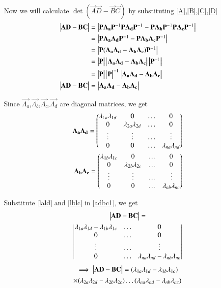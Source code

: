 \documentclass[journal,12pt,twocolumn]{IEEEtran}
\begin{document}
Now we will calculate $\det(\vec{A}\vec{D}-\vec{B}\vec{C})$ by substituting \eqref{A},\eqref{B},\eqref{C},\eqref{D}
\begin{align}
    \begin{vmatrix}\mathbf{A}\mathbf{D}-\mathbf{B}\mathbf{C}\end{vmatrix}&=\begin{vmatrix}\mathbf{P}\mathbf{\Lambda_a}\mathbf{P}^{-1}\mathbf{P}\mathbf{\Lambda_d}\mathbf{P}^{-1}-\mathbf{P}\mathbf{\Lambda_b}\mathbf{P}^{-1}\mathbf{P}\mathbf{\Lambda_c}\mathbf{P}^{-1}\end{vmatrix}\\
    &=\begin{vmatrix}\mathbf{P}\mathbf{\Lambda_a}\mathbf{\Lambda_d}\mathbf{P}^{-1}-\mathbf{P}\mathbf{\Lambda_b}\mathbf{\Lambda_c}\mathbf{P}^{-1}\end{vmatrix}\\
    &=\begin{vmatrix}\mathbf{P}(\mathbf{\Lambda_a}\mathbf{\Lambda_d}-\mathbf{\Lambda_b}\mathbf{\Lambda_c})\mathbf{P}^{-1}\end{vmatrix}\\
    &=\begin{vmatrix}\mathbf{P}\end{vmatrix}\begin{vmatrix}\mathbf{\Lambda_a}\mathbf{\Lambda_d}-\mathbf{\Lambda_b}\mathbf{\Lambda_c}\end{vmatrix}\begin{vmatrix}\mathbf{P}^{-1}\end{vmatrix}\\
    &=\begin{vmatrix}\mathbf{P}\end{vmatrix}\begin{vmatrix}\mathbf{P}\end{vmatrix}^{-1}\begin{vmatrix}\mathbf{\Lambda_a}\mathbf{\Lambda_d}-\mathbf{\Lambda_b}\mathbf{\Lambda_c}\end{vmatrix}\\
    \begin{vmatrix}\mathbf{A}\mathbf{D}-\mathbf{B}\mathbf{C}\end{vmatrix}&=\begin{vmatrix}\mathbf{\Lambda_a}\mathbf{\Lambda_d}-\mathbf{\Lambda_b}\mathbf{\Lambda_c}\end{vmatrix}\label{adbc1}
\end{align}

Since $\vec{\Lambda_a}$,$\vec{\Lambda_b}$,$\vec{\Lambda_c}$,$\vec{\Lambda_d}$ are diagonal matrices, we get
\begin{align}
    \mathbf{\Lambda_a}\mathbf{\Lambda_d}=\begin{pmatrix}\lambda_{1a}\lambda_{1d}&0&\dots&0\\0&\lambda_{2a}\lambda_{2d}&\dots&0\\\vdots&\vdots&\dots&\vdots\\0&0&\dots&\lambda_{na}\lambda_{nd}\end{pmatrix}\label{lald}\\
    \mathbf{\Lambda_b}\mathbf{\Lambda_c}=\begin{pmatrix}\lambda_{1b}\lambda_{1c}&0&\dots&0\\0&\lambda_{2b}\lambda_{2c}&\dots&0\\\vdots&\vdots&\dots&\vdots\\0&0&\dots&\lambda_{nb}\lambda_{nc}\end{pmatrix}\label{lblc}\\
\end{align}

Substitute \eqref{lald} and \eqref{lblc} in \eqref{adbc1}, we get
\begin{multline}
    \begin{vmatrix}\mathbf{A}\mathbf{D}-\mathbf{B}\mathbf{C}\end{vmatrix}=\\\begin{vmatrix}\lambda_{1a}\lambda_{1d}-\lambda_{1b}\lambda_{1c}&\dots&0\\0&\dots&0\\\vdots&\dots&\vdots\\0&\dots&\lambda_{na}\lambda_{nd}-\lambda_{nb}\lambda_{nc}\end{vmatrix}
\end{multline}
\begin{multline}
    \implies\begin{vmatrix}\mathbf{A}\mathbf{D}-\mathbf{B}\mathbf{C}\end{vmatrix}=(\lambda_{1a}\lambda_{1d}-\lambda_{1b}\lambda_{1c})\\\times(\lambda_{2a}\lambda_{2d}-\lambda_{2b}\lambda_{2c})\dots(\lambda_{na}\lambda_{nd}-\lambda_{nb}\lambda_{nc})\label{adbcfin}
\end{multline}
\end{document}
